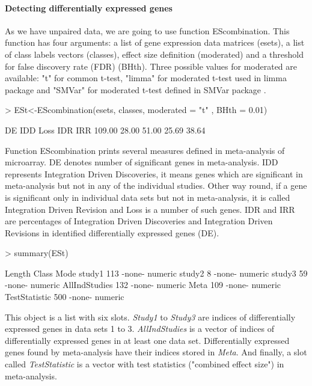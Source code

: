 \documentclass[a4paper]{report}
\begin{document}
\paragraph{Detecting differentially expressed genes}
As we have unpaired data, we are going to use function {\ttfamily EScombination}. This function has four arguments: a list of gene expression data matrices ({\ttfamily esets}), a list of class labels vectors ({\ttfamily classes}), effect size definition ({\ttfamily moderated})  and a threshold for false discovery rate (FDR) ({\ttfamily BHth}). Three possible values for {\ttfamily moderated} are available: {\ttfamily "t"} for common t-test, {\ttfamily "limma"} for moderated t-test used in limma package \cite{limma} and {\ttfamily "SMVar"} for moderated t-test defined in SMVar package \cite{SMVar}. 
\begin{Schunk}
\begin{Sinput}
> ESt<-EScombination(esets, classes, moderated = "t" , BHth = 0.01)
\end{Sinput}
\begin{Soutput}
    DE    IDD   Loss    IDR    IRR 
109.00  28.00  51.00  25.69  38.64 
\end{Soutput}
\end{Schunk}
Function {\ttfamily EScombination} prints several measures defined in meta-analysis of microarray. {\ttfamily DE} denotes number of significant genes in meta-analysis. {\ttfamily IDD} represents Integration Driven Discoveries, it means genes which are significant in meta-analysis but not in any of the individual studies. Other way round, if a gene is significant only in individual data sets but not in meta-analysis, it is called Integration Driven Revision and {\ttfamily Loss} is a number of such genes. {\ttfamily IDR} and {\ttfamily IRR} are percentages of Integration Driven Discoveries and Integration Driven Revisions in identified differentially expressed genes ({\ttfamily DE}). 
\begin{Schunk}
\begin{Sinput}
> summary(ESt)
\end{Sinput}
\begin{Soutput}
              Length Class  Mode   
study1        113    -none- numeric
study2          8    -none- numeric
study3         59    -none- numeric
AllIndStudies 132    -none- numeric
Meta          109    -none- numeric
TestStatistic 500    -none- numeric
\end{Soutput}
\end{Schunk}
This object is a list with six slots. \emph{Study1} to \emph{Study3} are indices of differentially expressed genes in data sets 1 to 3. \emph{AllIndStudies} is a vector of indices of differentially expressed genes in at least one data set. Differentially expressed genes found by meta-analysis have their indices stored in \emph{Meta}. And finally, a slot called \emph{TestStatistic} is a vector with test statistics ("combined effect size") in meta-analysis. 
\end{document}
